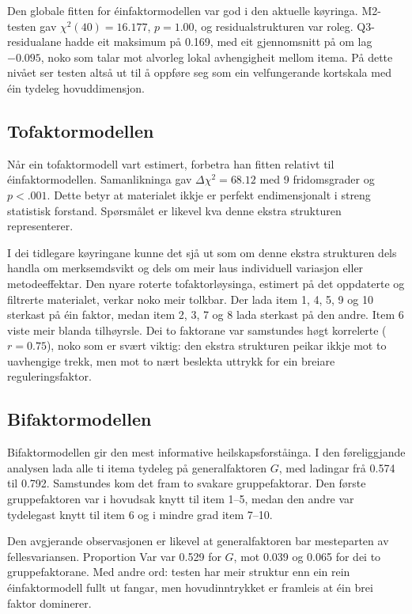 \documentclass[11pt,a4paper]{article}
\begin{document}
Den globale fitten for éinfaktormodellen var god i den aktuelle køyringa. M2-testen gav $\chi^2(40)=16.177$, $p=1.00$, og residualstrukturen var roleg. Q3-residualane hadde eit maksimum på 0.169, med eit gjennomsnitt på om lag $-0.095$, noko som talar mot alvorleg lokal avhengigheit mellom itema. På dette nivået ser testen altså ut til å oppføre seg som ein velfungerande kortskala med éin tydeleg hovuddimensjon.

\subsection{Tofaktormodellen}
Når ein tofaktormodell vart estimert, forbetra han fitten relativt til éinfaktormodellen. Samanlikninga gav $\Delta \chi^2 = 68.12$ med 9 fridomsgrader og $p < .001$. Dette betyr at materialet ikkje er perfekt endimensjonalt i streng statistisk forstand. Spørsmålet er likevel kva denne ekstra strukturen representerer.

I dei tidlegare køyringane kunne det sjå ut som om denne ekstra strukturen dels handla om merksemdsvikt og dels om meir laus individuell variasjon eller metodeeffektar. Den nyare roterte tofaktorløysinga, estimert på det oppdaterte og filtrerte materialet, verkar noko meir tolkbar. Der lada item 1, 4, 5, 9 og 10 sterkast på éin faktor, medan item 2, 3, 7 og 8 lada sterkast på den andre. Item 6 viste meir blanda tilhøyrsle. Dei to faktorane var samstundes høgt korrelerte ($r = 0.75$), noko som er svært viktig: den ekstra strukturen peikar ikkje mot to uavhengige trekk, men mot to nært beslekta uttrykk for ein breiare reguleringsfaktor.

\subsection{Bifaktormodellen}
Bifaktormodellen gir den mest informative heilskapsforståinga. I den føreliggjande analysen lada alle ti itema tydeleg på generalfaktoren $G$, med ladingar frå 0.574 til 0.792. Samstundes kom det fram to svakare gruppefaktorar. Den første gruppefaktoren var i hovudsak knytt til item 1--5, medan den andre var tydelegast knytt til item 6 og i mindre grad item 7--10.

Den avgjerande observasjonen er likevel at generalfaktoren bar mesteparten av fellesvariansen. Proportion Var var 0.529 for $G$, mot 0.039 og 0.065 for dei to gruppefaktorane. Med andre ord: testen har meir struktur enn ein rein éinfaktormodell fullt ut fangar, men hovudinntrykket er framleis at éin brei faktor dominerer.
\end{document}
